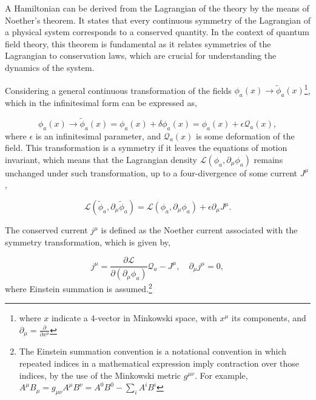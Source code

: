 \documentclass[11pt,a4paper,twoside,pdf]{article}
\numberwithin{equation}{section}
\begin{document}
A Hamiltonian can be derived from the Lagrangian of the theory by the means of Noether's
theorem\cite{Noether1918, Peskin:1995ev}. It states that every continuous 
symmetry of the Lagrangian of a physical system corresponds to a conserved quantity. 
In the context of quantum field theory, this theorem is fundamental as it relates 
symmetries of the Lagrangian to conservation laws, which are crucial for understanding 
the dynamics of the system.

Considering a general continuous transformation of the fields \(\phi_a(x) \rightarrow \tilde{\phi}_a(x)\)\footnote{where $x$ indicate a 4-vector in Minkowski space, with $x^\mu$ its components, and 
$\partial_\mu = \frac{\partial}{\partial x^\mu}$}, 
which in the infinitesimal form can be expressed as,

\begin{equation}
    \phi_a(x) \to \tilde{\phi}_a (x) = \phi_a(x) + \delta\phi_a(x) = \phi_a(x) + 
    \epsilon \mathcal{Q}_a(x),
\end{equation}
where \(\epsilon\) is an infinitesimal parameter, and \(\mathcal{Q}_a(x)\) is some 
deformation of the field. This transformation is a symmetry if it leaves the
equations of motion invariant, which means that the Lagrangian density
\(\mathcal{L}(\phi_a, \partial_\mu \phi_a)\) remains unchanged under such transformation,
up to a four-divergence of some current \(J^\mu\),

\begin{equation}
    \mathcal{L}(\tilde{\phi}_a, \partial_\mu \tilde{\phi}_a) = 
    \mathcal{L}(\phi_a, \partial_\mu \phi_a) + \epsilon \partial_\mu J^\mu.
    \label{eq:lagrangian_symmetry}
\end{equation}

The conserved current \(j^\mu\) is defined as the Noether current associated with the
symmetry transformation, which is given by,

\begin{equation}
    j^\mu = \frac{\partial \mathcal{L}}{\partial (\partial_\mu \phi_a)} \mathcal{Q}_a 
    - J^\mu, \quad \partial_\mu j^\mu = 0,
\end{equation}
where Einstein summation is assumed.\footnote{
    The Einstein summation convention is a notational convention in which repeated 
    indices in a mathematical expression imply contraction over those indices, by the 
    use of the Minkowski metric \(g^{\mu\nu}\). For example, $A^\mu B_\mu = g_{\mu\nu} 
    A^\mu B^\nu = A^0 B^0 - \sum_i A^i B^i$ 
}
\end{document}

